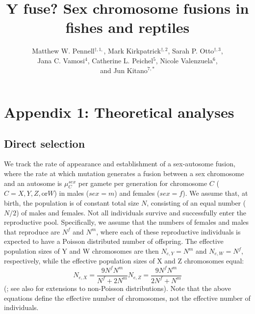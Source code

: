 \documentclass[12pt,twoside]{article}
\title{Y fuse? Sex chromosome fusions in fishes and reptiles}
\author{Matthew W. Pennell$^{\dag, 1,}$, Mark Kirkpatrick$^{\dag, 2}$, Sarah P. Otto$^{\dag, 3}$,\\ Jana C. Vamosi$^{4}$, Catherine L. Peichel$^5$, Nicole Valenzuela$^{6}$,\\ and Jun Kitano$^{7,*}$}
\date{}
\begin{document}
\maketitle


\section{Appendix 1: Theoretical analyses}

\subsection{Direct selection}

We track the rate of appearance and establishment of a sex-autosome fusion, where the rate at which mutation generates a fusion between a sex chromosome and an autosome is $\mu^{sex}_C$ per gamete per generation for chromosome $C$ ($C = X, Y, Z, \text{or} W$) in males ($sex = m$) and females ($sex = f$). We assume that, at birth, the population is of constant total size $N$, consisting of an equal number ($N/\text{2}$) of males and females. Not all individuals survive and successfully enter the reproductive pool. Specifically, we assume that the numbers of females and males that reproduce are $N^f$ and $N^m$, where each of these reproductive individuals is expected to have a Poisson distributed number of offspring. The effective population sizes of Y and W chromosomes are then $N_{e,Y}=N^m$ and $N_{e,W}=N^f$, respectively, while the effective population sizes of X and Z chromosomes equal:
\begin{subequations}
\begin{equation}
N_{e,X} = \frac{\text{9}N^fN^m}{N^f + \text{2}N^m}
\end{equation}
\begin{equation}
N_{e,Z} = \frac{\text{9}N^fN^m}{\text{2}N^f + N^m}
\end{equation}
\end{subequations}
(\citealt{Wright1933}; see also \citealt{Caballero1995} for extensions to non-Poisson distributions). Note that the above equations define the effective number of chromosomes, not the effective number of individuals.
\end{document}
